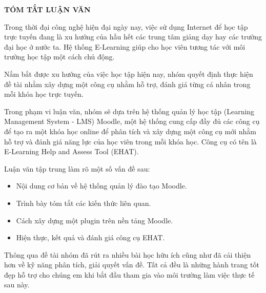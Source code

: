 \centerline{\bf \large\MakeUppercase{Tóm tắt luận văn}}
\vspace{20pt}

Trong thời đại công nghệ hiện đại ngày nay, việc sử dụng Internet để học tập trực tuyến đang là xu hướng của hầu hết các trung tâm giảng dạy hay các trường đại học ở nước ta. Hệ thống E-Learning giúp cho học viên tương tác với môi trường học tập một cách chủ động.

Nắm bắt được xu hướng của việc học tập hiện nay, nhóm quyết định thực hiện đề tài nhằm xây dựng một công cụ nhằm hỗ trợ, đánh giá từng cá nhân trong mỗi khóa học trực tuyến.

Trong phạm vi luận văn, nhóm sẽ dựa trên hệ thống quản lý học tập (Learning Management System - LMS) Moodle, một hệ thống cung cấp đầy đủ các công cụ để tạo ra một khóa học online để phân tích và xây dựng một công cụ mới nhằm hỗ trợ và đánh giá năng lực của học viên trong mỗi khóa học. Công cụ có tên là E-Learning Help and Assess Tool (EHAT).

Luận văn tập trung làm rõ một số vấn đề sau:

\begin{itemize}
	\item Nội dung cơ bản về hệ thống quản lý đào tạo Moodle.
	\item Trình bày tóm tắt các kiến thức liên quan.
	\item Cách xây dựng một plugin trên nền tảng Moodle.
	\item Hiện thực, kết quả và đánh giá công cụ EHAT.
\end{itemize}

Thông qua đề tài nhóm đã rút ra nhiều bài học hữu ích cũng như đã cải thiện hơn về kỹ năng phân tích, giải quyết vấn đề. Tất cả đều là những hành trang tốt đẹp hỗ trợ cho chúng em khi bắt đầu tham gia vào môi trường làm việc thực tế sau này.